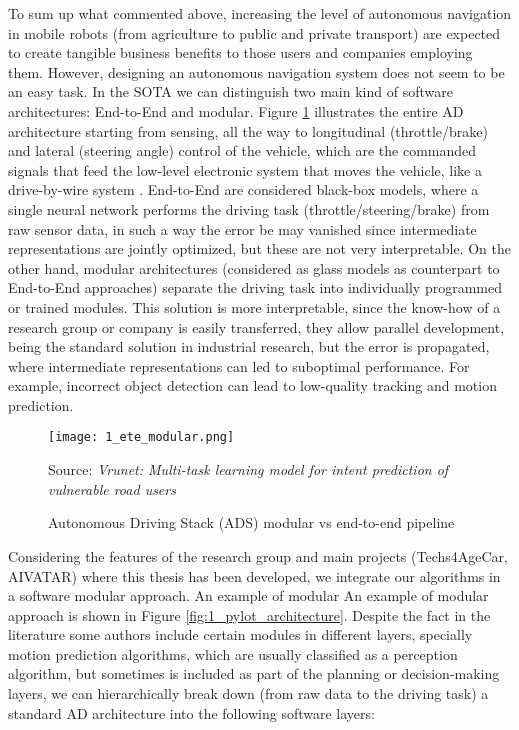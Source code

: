 To sum up what commented above, increasing the level of autonomous navigation in mobile robots (from agriculture to public and private transport) are expected to create tangible business benefits to those users and companies employing them. However, designing an autonomous navigation system does not seem to be an easy task. In the \ac{SOTA} we can distinguish two main kind of software architectures: End-to-End and modular. Figure \ref{fig:1_ete_modular} illustrates the entire \ac{AD} architecture starting from sensing, all the way to longitudinal (throttle/brake) and lateral (steering angle) control of the vehicle, which are the commanded signals that feed the low-level electronic system that moves the vehicle, like a drive-by-wire system \cite{arango2020drive}. End-to-End are considered black-box models, where a single neural network performs the driving task (throttle/steering/brake) from raw sensor data, in such a way the error be may vanished since intermediate representations are jointly optimized, but these are not very interpretable. On the other hand, modular architectures (considered as glass models as counterpart to End-to-End approaches) separate the driving task into individually programmed or trained modules. This solution is more interpretable, since the know-how of a research group or company is easily transferred, they allow parallel development, being the standard solution in industrial research, but the error is propagated, where intermediate representations can led to suboptimal performance. For example, incorrect object detection can lead to low-quality tracking and motion prediction.

\begin{figure}[h]
	\centering
	\texttt{[image: 1\_ete\_modular.png]}
	\caption{Autonomous Driving Stack (ADS) modular vs end-to-end pipeline}
	Source: \textit{Vrunet: Multi-task learning model for intent prediction of vulnerable road users} \cite{ranga2020vrunet}
	\label{fig:1_ete_modular}
\end{figure}

Considering the features of the research group and main projects (Techs4AgeCar, AIVATAR) where this thesis has been developed, we integrate our algorithms in a software modular approach. An example of modular 
An example of modular approach is shown in Figure \ref{fig:1_pylot_architecture}. Despite the fact in the literature some authors include certain modules in different layers, specially motion prediction algorithms, which are usually classified as a perception algorithm, but sometimes is included as part of the planning or decision-making layers, we can hierarchically break down (from raw data to the driving task) a standard \ac{AD} architecture into the following software layers:


